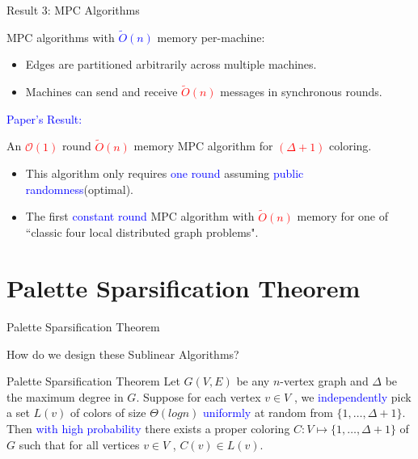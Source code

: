 \documentclass[aspectratio=169,xcolor=dvipsnames]{beamer}
\begin{document}
	\begin{frame}{Result 3: MPC Algorithms}
		
		MPC algorithms with \textcolor{blue}{{$\tilde{O}(n)$}} memory per-machine:
		\begin{itemize}
			\item Edges are partitioned arbitrarily across multiple machines.
			\item Machines can send and receive \textcolor{red}{$\tilde{O}(n)$} messages in synchronous rounds.
		\end{itemize}
		
		\vspace{1em}
		\textcolor{blue}{Paper's Result:}
		\begin{block}{}
			An \textcolor{red}{$\mathcal{O}(1)$} round \textcolor{red}{$\tilde{O}(n)$} memory MPC algorithm for \textcolor{red}{$(\Delta + 1)$} coloring.
		\end{block}
		
		\begin{itemize}
			\item This algorithm only requires \textcolor{blue}{one round} assuming \textcolor{blue}{public randomness}(optimal).
			\item The first \textcolor{blue}{constant round} MPC algorithm with \textcolor{red}{$\tilde{O}(n)$} memory for one of ``classic four local distributed graph problems".
		\end{itemize}
		
	\end{frame}
	
	\section{Palette Sparsification Theorem}
	
	\begin{frame}{Palette Sparsification Theorem}
		
		\begin{alertblock}{}
			How do we design these Sublinear Algorithms?
		\end{alertblock}
		\begin{block}{Palette Sparsification Theorem}
			Let \alert{$G(V,E)$} be any \alert{$n$-vertex} graph and \alert{$\Delta$} be
			the maximum degree in \alert{$G$}. Suppose for each vertex \alert{$v \in V$} , we \textcolor{blue}{independently} pick a set \alert{$L(v)$} of colors of size
			\alert{$\Theta(log n)$} \textcolor{blue}{uniformly} at random from \alert{$\{1, \dots, \Delta + 1\}$}. Then \textcolor{blue}{with high probability} there exists a proper coloring \alert{$C : V \mapsto \{1, \dots, \Delta + 1\}$} of \alert{$G$} such that for all vertices \alert{$v \in V$} , \alert{$C(v) \in L(v)$}.
		\end{block}
		
	\end{frame}
	
\end{document}
